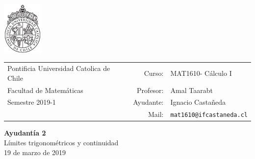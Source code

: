 \documentclass[12pt]{article}
\makeatletter
\newcommand{\ayudantia}{{\sc Ayudantía 2}}
\newcommand{\tituloayu}{Límites trigonométricos y continuidad}
\newcommand{\fecha}{19 de marzo de 2019}
\newcommand{\sigla}{MAT1610}
\newcommand{\nombre}{Cálculo I}
\newcommand{\profesor}{Amal Taarabt}
\newcommand{\ano}{2019}
\newcommand{\semestre}{1}
\newcommand{\mail}{mat1610@ifcastaneda.cl}
\makeatother
\begin{document}
\thispagestyle{empty}

\begin{minipage}{2cm}
	\includegraphics[width=2cm]{../../../../img/logo.pdf}
	\vspace{0.5cm}
\end{minipage}
\begin{minipage}{\linewidth}
	\begin{tabular}{lrl}
		{\scriptsize\sc Pontificia Universidad Catolica de Chile} & \hspace*{0.7in}Curso: &
		\sigla  - \nombre\\
		{\sc Facultad de Matemáticas}&
		Profesor: & \profesor \\
		{\sc Semestre \ano-\semestre} & Ayudante: & {Ignacio Castañeda}\\
		& {Mail:} & \texttt{\mail}
	\end{tabular}
\end{minipage}

\vspace{-10mm}
\begin{center}
	{\LARGE\bf \ayudantia}\\
	\vspace{0.1cm}
	{\tituloayu}\\
	\vspace{0.1cm}
	\fecha\\
	\vspace{0.4cm}
\end{center}
\end{document}
